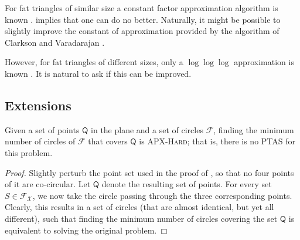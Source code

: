 \documentclass[12pt]{article}
\newcommand{\PntSet}{{\mathsf{Q}}}
\providecommand{\ComplexityClass}[1]{{{\textcolor[named]{\si{OliveGreen}}{\textsc{#1}}}}}
\providecommand{\APXHard}{{\ComplexityClass{\si{APX}-Hard}}\xspace}
\providecommand{\PTAS}{\textsf{\si{PTAS}}\xspace}
\newcommand{\Family}{\mathcal{F}}
\begin{document}
\begin{remark}
    For fat triangles of similar size a constant factor approximation
    algorithm is known \cite{cv-iaags-07}.  
    implies that one can do no better. Naturally, it might be possible
    to slightly improve the constant of approximation provided by the
    algorithm of Clarkson and Varadarajan \cite{cv-iaags-07}.

    However, for fat triangles of different sizes, only a $\log \log
    \log$ approximation is known \cite{aes-ssena-09}. It is natural to
    ask if this can be improved.
\end{remark}

\subsection{Extensions}

\begin{lemma}
    Given a set of points $\PntSet$ in the plane and a set of circles
    $\Family$, finding the minimum number of circles of $\Family$ that
    covers $\PntSet$ is \APXHard; that is, there is no \PTAS for this
    problem.

\end{lemma}
\begin{proof}
    Slightly perturb the point set used in the proof of ,
    so that no four points of it are co-circular. Let $\PntSet$
    denote the resulting set of points. For every set $S \in
    \Family_{\mathcal{X}}$, we now take the circle passing through the
    three corresponding points. Clearly, this results in a set of
    circles (that are almost identical, but yet all different), such
    that finding the minimum number of circles covering the set
    $\PntSet$ is equivalent to solving the original problem.
\end{proof}
\end{document}
